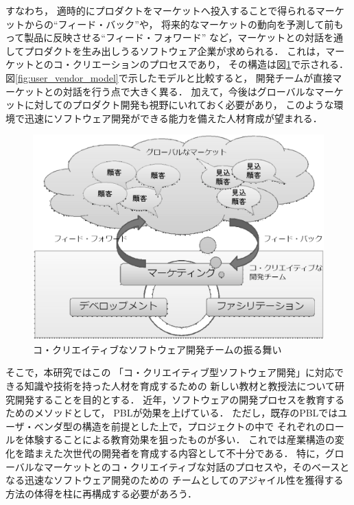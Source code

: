 \documentclass[a4j,9pt,twoside,twocolumn]{jsarticle}
\begin{document}
    すなわち，
    適時的にプロダクトをマーケットへ投入することで得られるマーケットからの``フィード・バック''や，
    将来的なマーケットの動向を予測して前もって製品に反映させる``フィード・フォワード''
    など，マーケットとの対話を通してプロダクトを生み出しうるソフトウェア企業が求められる．
    これは，マーケットとのコ・クリエーションのプロセスであり，
    その構造は図\ref{fig:CcSD}で示される．
    図\ref{fig:user_vendor_model}で示したモデルと比較すると，
    開発チームが直接マーケットとの対話を行う点で大きく異る．
    加えて，今後はグローバルなマーケットに対してのプロダクト開発も視野にいれておく必要があり，
    このような環境で迅速にソフトウェア開発ができる能力を備えた人材育成が望まれる．
    
\begin{figure}[h]
\begin{center}
\includegraphics[width=\linewidth]{figs/CcSD.eps}
\caption{コ・クリエイティブなソフトウェア開発チームの振る舞い}
\label{fig:CcSD}
\end{center}
\end{figure}
    
    そこで，本研究ではこの
    「コ・クリエイティブ型ソフトウェア開発」に対応できる知識や技術を持った人材を育成するための
    新しい教材と教授法について研究開発することを目的とする．
    近年，ソフトウェアの開発プロセスを教育するためのメソッドとして，
    PBLが効果を上げている\cite{pub:matsuzawa-2008}．
    ただし，既存のPBLではユーザ・ベンダ型の構造を前提とした上で，プロジェクトの中で
    それぞれのロールを体験することによる教育効果を狙ったものが多い．
    これでは産業構造の変化を踏まえた次世代の開発者を育成する内容として不十分である．
    特に，グローバルなマーケットとのコ・クリエイティブな対話のプロセスや，そのベースとなる迅速なソフトウェア開発のための
    チームとしてのアジャイル性を獲得する方法の体得を柱に再構成する必要があろう．
    
\end{document}

